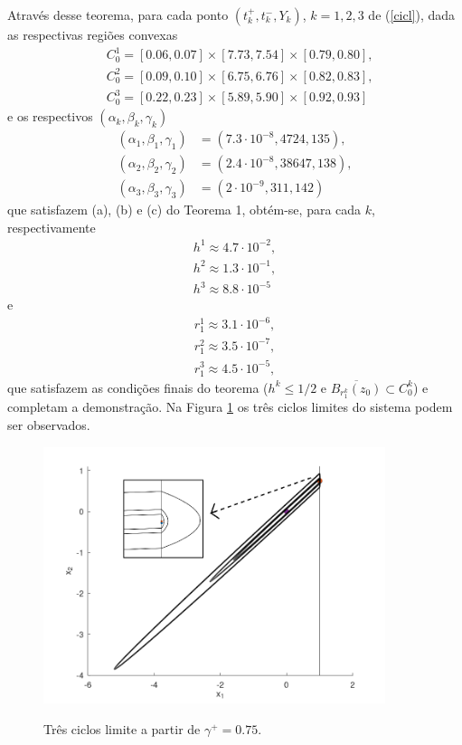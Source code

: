 Através desse teorema, para cada ponto $(t^+_k, t^−_k, Y_k)$, $k=1, 2, 3$ de (\ref{cicl}), dada as respectivas regiões convexas
$$
\begin{aligned}
&C_{0}^{1}=
[0.06,0.07] \times[7.73,7.54] \times[0.79,0.80],\\
&C_{0}^{2}=[0.09,0.10] \times[6.75,6.76] \times[0.82,0.83],\\
&C_{0}^{3}=[0.22,0.23] \times[5.89,5.90] \times[0.92,0.93]
\end{aligned}
$$
e os respectivos $(\alpha_k, \beta_k, \gamma_k)$
\[
\begin{aligned}
(\alpha_1, \beta_1, \gamma_1)&=(7.3\cdot10^{-8}, 4724,135),
\\
(\alpha_2, \beta_2, \gamma_2)&=(2.4\cdot10^{-8},38647,138),
\\
(\alpha_3, \beta_3, \gamma_3)&=(2\cdot10^{-9},311,142)
\end{aligned}
\]
que satisfazem (a), (b) e (c) do Teorema 1, obtém-se, para cada $k$, respectivamente
\begin{align*}
h^1\approx4.7\cdot10^{-2},\\
h^2\approx1.3\cdot10^{-1},\\
h^3\approx8.8\cdot10^{-5}
\end{align*}
e
\begin{align*}
r_1^1\approx3.1\cdot 10^{-6},\\
r_1^2\approx3.5\cdot10^{-7},\\
r_1^3\approx4.5\cdot10^{-5},    
\end{align*}
que satisfazem as condições finais do teorema ($h^k \leq 1 / 2$ e $\overline{B_{r_{1}^k}\left(z_{0}\right)} \subset C_{0}^k$) e completam a demonstração. Na Figura \ref{triz} os três ciclos limites do sistema podem ser observados.

\begin{figure}[H]
\centering
\includegraphics[width=10cm]{triz}\\
\vspace{\baselineskip}
\caption{\label{triz}Três ciclos limite a partir de $\gamma^+=0.75$.}
\end{figure}
